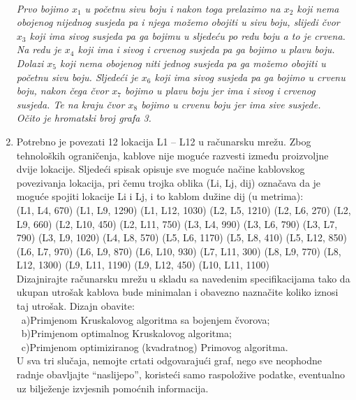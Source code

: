 \documentclass[12pt]{article}
\begin{document}
\begin{enumerate}
\begin{center}
\vspace{0.5cm}
\textit{\\Prvo bojimo $x_1$ u početnu sivu boju i nakon toga prelazimo na $x_2$ koji nema obojenog nijednog susjeda pa i njega možemo obojiti u sivu boju, slijedi čvor $x_3$ koji ima sivog susjeda pa ga bojimu u sljedeću po redu boju a to je crvena. Na redu je $x_4$ koji ima i sivog i crvenog susjeda pa ga bojimo u plavu boju. Dolazi $x_5$ koji nema obojenog niti jednog susjeda pa ga možemo obojiti u početnu sivu boju. Sljedeći je $x_6$ koji ima sivog susjeda pa ga bojimo u crvenu boju, nakon čega čvor $x_7$ bojimo u plavu boju jer ima i sivog i crvenog susjeda. Te na kraju čvor $x_8$ bojimo u crvenu boju jer ima sive susjede.\\ Očito je hromatski broj grafa 3.}    
\end{center}
\vspace{0.75cm}
	\item Potrebno je povezati 12 lokacija L1 – L12 u računarsku mrežu. Zbog tehnoloških ograničenja, kablove nije moguće razvesti između proizvoljne dvije lokacije. Sljedeći spisak opisuje sve moguće načine kablovskog povezivanja lokacija, pri čemu trojka oblika (Li, Lj, dij) označava da je moguće spojiti lokacije Li i Lj, i to kablom dužine dij (u metrima): \\

(L1, L4, 670)   (L1, L9, 1290)   (L1, L12, 1030)   (L2, L5, 1210)   (L2, L6, 270)   (L2, L9, 660)   (L2, L10, 450)   (L2, L11, 750)   (L3, L4, 990)   (L3, L6, 790)   (L3, L7, 790)   (L3, L9, 1020)   (L4, L8, 570)   (L5, L6, 1170)   (L5, L8, 410)   (L5, L12, 850)   (L6, L7, 970)   (L6, L9, 870)   (L6, L10, 930)   (L7, L11, 300)   (L8, L9, 770)   (L8, L12, 1300)   (L9, L11, 1190)   (L9, L12, 450)   (L10, L11, 1100)   \\

Dizajnirajte računarsku mrežu u skladu sa navedenim specifikacijama tako da ukupan utrošak kablova bude minimalan i obavezno naznačite koliko iznosi taj utrošak. Dizajn obavite:\\
\ a)Primjenom Kruskalovog algoritma sa bojenjem čvorova;\\
\ b)Primjenom optimalnog Kruskalovog algoritma;\\
\ c)Primjenom optimiziranog (kvadratnog) Primovog algoritma.\\
U sva tri slučaja, nemojte crtati odgovarajući graf, nego sve neophodne radnje obavljajte “naslijepo”, koristeći samo raspoložive podatke, eventualno uz bilježenje izvjesnih pomoćnih informacija.


\end{enumerate}
\end{document}
